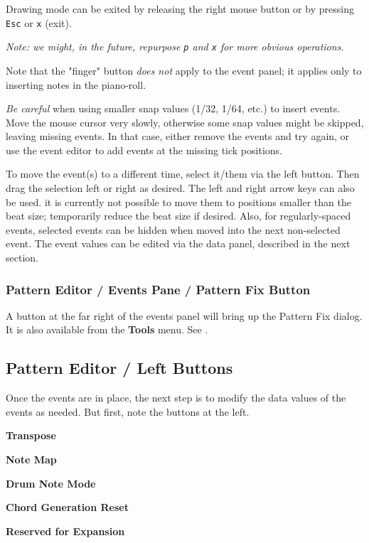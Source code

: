    Drawing mode can be exited by releasing the right mouse button or
   by pressing \texttt{Esc} or \texttt{x} (exit).

   \textsl{Note: we might, in the future, repurpose \texttt{p} and
   \texttt{x} for more obvious operations.}

   Note that the "finger" button \textsl{does not} apply to the event panel;
   it applies only to inserting notes in the piano-roll.

   \textsl{Be careful}
   when using smaller snap values (1/32, 1/64, etc.) to insert events.
   Move the mouse cursor very slowly, otherwise some snap values might be
   skipped, leaving missing events.  In that case, either remove the events and
   try again, or use the event editor to add events at the missing tick
   positions.

   To move the event(s) to a different time, select it/them via the left
   button.  Then drag the selection left or right as desired.
   The left and right arrow keys can also be used.
   it is currently not possible to move them to positions smaller than the
   beat size; temporarily reduce the beat size if desired.
   Also, for regularly-spaced events, selected events can be hidden when moved
   into the next non-selected event.
   The event values can be edited via the data panel, described in the next
   section.
 
\subsubsection{Pattern Editor / Events Pane / Pattern Fix Button}
\label{subsubsec:pattern_editor_events_pane_pattern_fix}

   A button at the far right of the events panel will
   bring up the Pattern Fix dialog.
   It is also available from the \textbf{Tools} menu.
   See .

\subsection{Pattern Editor / Left Buttons}
\label{subsec:pattern_editor_left_buttons}

   Once the events are in place, the next step is to modify the
   data values of the events as needed.
   But first, note the buttons at the left.

   \begin{enumber}
      \item \textbf{Transpose}
      \item \textbf{Note Map}
      \item \textbf{Drum Note Mode}
      \item \textbf{Chord Generation Reset}
      \item \textbf{Reserved for Expansion}
   \end{enumber}


